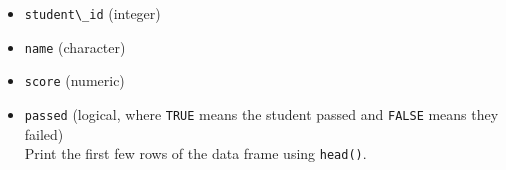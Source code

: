 \documentclass[
]{book}
\newcommand{\passthrough}[1]{#1}
\providecommand{\tightlist}{%
  \setlength{\itemsep}{0pt}\setlength{\parskip}{0pt}}
\theoremstyle{definition}
\theoremstyle{definition}
\theoremstyle{definition}
\theoremstyle{definition}
\theoremstyle{remark}
\begin{document}
\begin{itemize}
\tightlist
\item
  \passthrough{\lstinline!student\_id!} (integer)\\
\item
  \passthrough{\lstinline!name!} (character)\\
\item
  \passthrough{\lstinline!score!} (numeric)\\
\item
  \passthrough{\lstinline!passed!} (logical, where \passthrough{\lstinline!TRUE!} means the student passed and \passthrough{\lstinline!FALSE!} means they failed)\\
  Print the first few rows of the data frame using \passthrough{\lstinline!head()!}.\\
\end{itemize}
\end{document}
